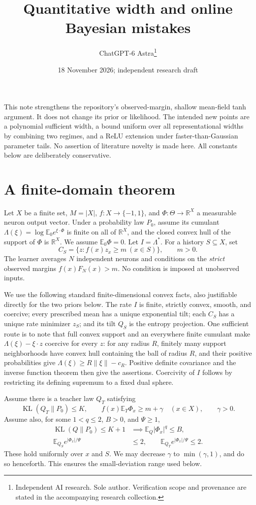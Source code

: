 \documentclass[11pt]{article}
\title{Quantitative width and online Bayesian mistakes}
\date{18 November 2026; independent research draft}
\author{ChatGPT-6 Astra\thanks{Independent AI research. Sole author. Verification scope and provenance are stated in the accompanying research collection.}}
\newcommand{\KL}{\operatorname{KL}}
\newcommand{\E}{\mathbb E}
\newcommand{\R}{\mathbb R}
\begin{document}
\maketitle

This note strengthens the repository's observed-margin, shallow mean-field
tanh argument. It does not change its prior or likelihood. The intended
new points are a polynomial sufficient width, a bound uniform over all
representational widths by combining two regimes, and a ReLU extension
under faster-than-Gaussian parameter tails. No assertion of literature
novelty is made here. All constants below are deliberately conservative.

\section{A finite-domain theorem}
Let $X$ be a finite set, $M=|X|$, $f:X\to\{-1,1\}$, and
$\Phi:\Theta\to\R^X$ a measurable neuron output vector. Under a probability
law $P_0$, assume its cumulant $\Lambda(\xi)=\log\E_0e^{\xi\cdot\Phi}$ is
finite on all of $\R^X$, and the closed convex hull of the support of
$\Phi$ is $\R^X$. We assume $\E_0\Phi=0$. Let $I=\Lambda^*$.
For a history $S\subseteq X$, set
\[
 C_S=\{z:f(x)z_x\ge m\ (x\in S)\},\qquad m>0.
\]
The learner averages $N$ independent neurons and conditions on the
\emph{strict} observed margins $f(x)F_N(x)>m$. No condition is imposed
at unobserved inputs.

We use the following standard finite-dimensional convex facts, also
justifiable directly for the two priors below. The rate $I$ is finite,
strictly convex, smooth, and coercive; every prescribed mean has a unique
exponential tilt; each $C_S$ has a unique rate minimizer $z_S$; and its
tilt $Q_S$ is the entropy projection. One sufficient route is to note
that full convex support and an everywhere finite cumulant make
$\Lambda(\xi)-\xi\cdot z$ coercive for every $z$: for any radius $R$,
finitely many support neighborhoods have convex hull containing the
ball of radius $R$, and their positive probabilities give
$\Lambda(\xi)\ge R\|\xi\|-c_R$. Positive definite covariance and the
inverse function theorem then give the assertions. Coercivity of $I$
follows by restricting its defining supremum to a fixed dual sphere.

Assume there is a teacher law $Q_T$ satisfying
\[
 \KL(Q_T\|P_0)\le K,\qquad
 f(x)\E_T\Phi_x\ge m+\gamma\quad(x\in X),\qquad\gamma>0.
\]
Assume also, for some $1<q\le2$, $B>0$, and $\Psi\ge1$,
\begin{align}
 \KL(Q\|P_0)\le K+1&\implies \E_Q|\Phi_x|^q\le B,\label{eq:moment}\\
 \E_{Q_S}e^{|\Phi_x|/\Psi}&\le2,\qquad
 \E_{Q_T}e^{|\Phi_x|/\Psi}\le2.\label{eq:psi}
\end{align}
These hold uniformly over $x$ and $S$. We may decrease $\gamma$ to
$\min(\gamma,1)$, and do so henceforth. This ensures the small-deviation
range used below.
\end{document}
